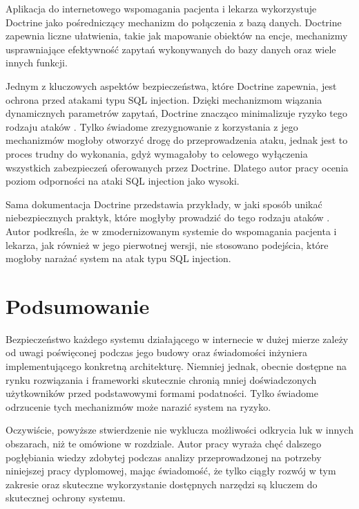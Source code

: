 \documentclass[12pt,twoside]{book}
\begin{document}
    Aplikacja do internetowego wspomagania pacjenta i lekarza wykorzystuje Doctrine jako pośredniczący mechanizm do połączenia z bazą danych. Doctrine zapewnia liczne ułatwienia, takie jak mapowanie obiektów na encje, mechanizmy usprawniające efektywność zapytań wykonywanych do bazy danych oraz wiele innych funkcji.

    Jednym z kluczowych aspektów bezpieczeństwa, które Doctrine zapewnia, jest ochrona przed atakami typu SQL injection. Dzięki mechanizmom wiązania dynamicznych parametrów zapytań, Doctrine znacząco minimalizuje ryzyko tego rodzaju ataków \cite{doctrine.orm}. Tylko świadome zrezygnowanie z korzystania z jego mechanizmów mogłoby otworzyć drogę do przeprowadzenia ataku, jednak jest to proces trudny do wykonania, gdyż wymagałoby to celowego wyłączenia wszystkich zabezpieczeń oferowanych przez Doctrine. Dlatego autor pracy ocenia poziom odporności na ataki SQL injection jako wysoki.

    Sama dokumentacja Doctrine przedstawia przykłady, w jaki sposób unikać niebezpiecznych praktyk, które mogłyby prowadzić do tego rodzaju ataków \cite{doctrine.security}. Autor podkreśla, że w zmodernizowanym systemie do wspomagania pacjenta i lekarza, jak również w jego pierwotnej wersji, nie stosowano podejścia, które mogłoby narażać system na atak typu SQL injection.

    \section{Podsumowanie}
    Bezpieczeństwo każdego systemu działającego w internecie w dużej mierze zależy od uwagi poświęconej podczas jego budowy oraz świadomości inżyniera implementującego konkretną architekturę. Niemniej jednak, obecnie dostępne na rynku rozwiązania i frameworki skutecznie chronią mniej doświadczonych użytkowników przed podstawowymi formami podatności. Tylko świadome odrzucenie tych mechanizmów może narazić system na ryzyko.

    Oczywiście, powyższe stwierdzenie nie wyklucza możliwości odkrycia luk w innych obszarach, niż te omówione w rozdziale. Autor pracy wyraża chęć dalszego pogłębiania wiedzy zdobytej podczas analizy przeprowadzonej na potrzeby niniejszej pracy dyplomowej, mając świadomość, że tylko ciągły rozwój w tym zakresie oraz skuteczne wykorzystanie dostępnych narzędzi są kluczem do skutecznej ochrony systemu.


    
    
    \listoffigures
    \listoftables
\end{document}
